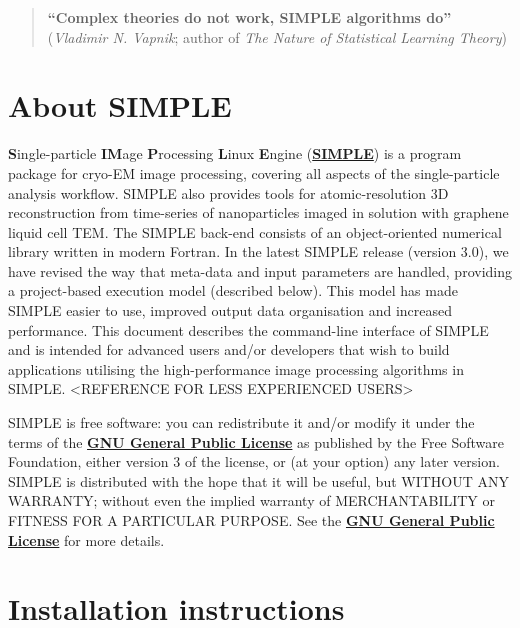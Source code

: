 \documentclass[a4paper,11pt]{article}
\begin{document}
\begin{quote}
\textbf{``Complex theories do not work, SIMPLE algorithms do''}\\(\textit{Vladimir N. Vapnik}; author of \textit{The Nature of Statistical Learning Theory})
\end{quote}
\clearpage

\tableofcontents{}
\clearpage

\section{About SIMPLE}

\textbf{S}ingle-particle \textbf{IM}age \textbf{P}rocessing \textbf{L}inux \textbf{E}ngine (\href{www.simplecryoem.com}{\textbf{\textcolor{BurntOrange}{SIMPLE}}}) is a program package for cryo-EM image processing, covering all aspects of the single-particle analysis workflow. SIMPLE also provides tools for atomic-resolution 3D reconstruction from time-series of nanoparticles imaged in solution with graphene liquid cell TEM. The SIMPLE back-end consists of an object-oriented numerical library written in modern Fortran. In the latest SIMPLE release (version 3.0), we have revised the way that meta-data and input parameters are handled, providing a project-based execution model (described below). This model has made SIMPLE easier to use, improved output data organisation and increased performance. This document describes the command-line interface of SIMPLE and is intended for advanced users and/or developers that wish to build applications utilising the high-performance image processing algorithms in SIMPLE. <REFERENCE FOR LESS EXPERIENCED USERS>
 
SIMPLE is free software: you can redistribute it and/or modify it under the terms of the \href{http://www.gnu.org/copyleft/gpl.html}{\textbf{\textcolor{BurntOrange}{GNU General Public License}}} as published by the Free Software Foundation, either version 3 of the license, or (at your option) any later version. SIMPLE is distributed with the hope that it will be useful, but WITHOUT ANY WARRANTY; without even the implied warranty of MERCHANTABILITY or FITNESS FOR A PARTICULAR PURPOSE. See the \href{http://www.gnu.org/copyleft/gpl.html}{\textbf{\textcolor{BurntOrange}{GNU General Public License}}} for more details.

\section{Installation instructions}
\end{document}
